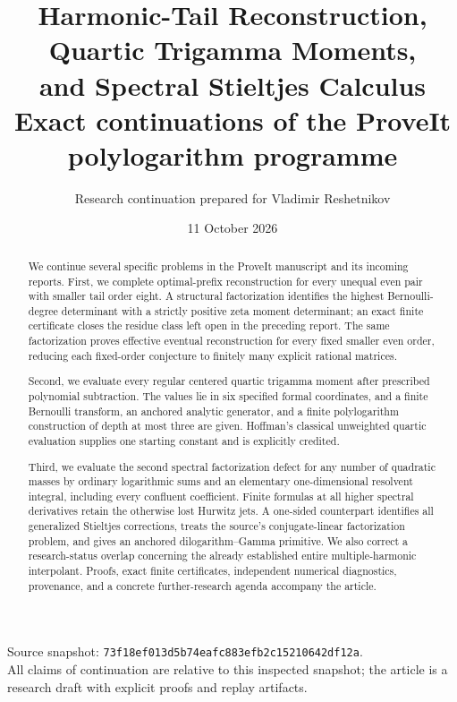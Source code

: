 \documentclass[11pt,a4paper]{article}
\title{\textbf{Harmonic-Tail Reconstruction,\\
Quartic Trigamma Moments,\\and Spectral Stieltjes Calculus}\\[8pt]
\large Exact continuations of the ProveIt polylogarithm programme}
\author{Research continuation prepared for Vladimir Reshetnikov}
\date{11 October 2026}
\numberwithin{equation}{section}
\theoremstyle{plain}
\theoremstyle{definition}
\theoremstyle{remark}
\newcommand{\sourcepin}{\texttt{73f18ef013d5b74eafc883efb2c15210642df12a}}
\begin{document}
\maketitle
\begin{abstract}
We continue several specific problems in the ProveIt manuscript and its
incoming reports.  First, we complete optimal-prefix reconstruction for
every unequal even pair with smaller tail order eight.  A structural
factorization identifies the highest Bernoulli-degree determinant with a
strictly positive zeta moment determinant; an exact finite certificate
closes the residue class left open in the preceding report.  The same
factorization proves effective eventual reconstruction for every fixed
smaller even order, reducing each fixed-order conjecture to finitely many
explicit rational matrices.

Second, we evaluate every regular centered quartic trigamma moment after
prescribed polynomial subtraction.  The values lie in six specified
formal coordinates, and a finite Bernoulli transform, an anchored analytic
generator, and a finite polylogarithm construction of depth at most three
are given.  Hoffman's classical unweighted quartic evaluation supplies
one starting constant and is explicitly credited.

Third, we evaluate the second spectral factorization defect for any
number of quadratic masses by ordinary logarithmic sums and an elementary
one-dimensional resolvent integral, including every confluent coefficient.
Finite formulas at all higher spectral derivatives retain the otherwise
lost Hurwitz jets.  A one-sided counterpart identifies all generalized
Stieltjes corrections, treats the source's conjugate-linear factorization
problem, and gives an anchored dilogarithm--Gamma primitive.
We also correct a research-status overlap concerning the already
established entire multiple-harmonic interpolant.  Proofs, exact finite
certificates, independent numerical diagnostics, provenance, and a
concrete further-research agenda accompany the article.
\end{abstract}
\begin{center}
\small Source snapshot: \sourcepin.\\
All claims of continuation are relative to this inspected snapshot;
the article is a research draft with explicit proofs and replay artifacts.
\end{center}
\clearpage
\begingroup\small
\tableofcontents
\endgroup
\clearpage








\appendix


\end{document}
